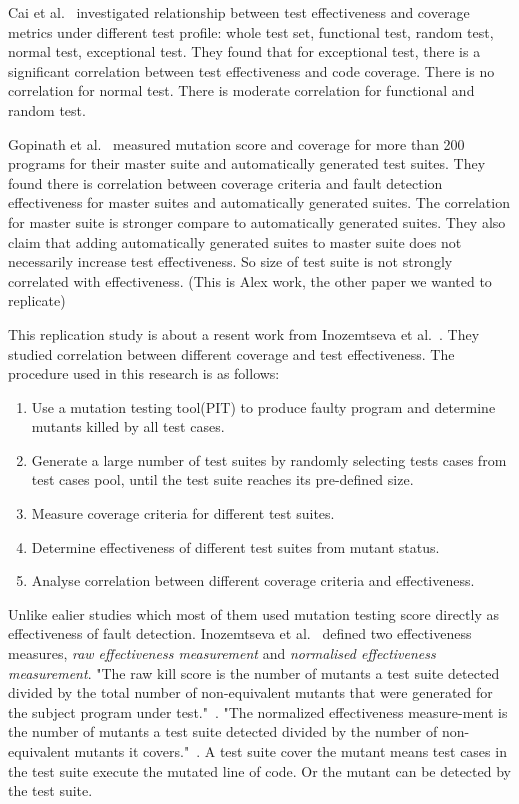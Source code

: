 Cai et al.~\cite{cai2005effect} investigated relationship between test effectiveness and coverage metrics under different test profile: whole test set, functional test, random test, normal test, exceptional test. They found that for exceptional test, there is a significant correlation between test effectiveness and code coverage. There is no correlation for normal test. There is moderate correlation for functional and random test.

Gopinath et al.~\cite{gopinath2014code} measured mutation score and coverage for more than 200 programs for their master suite and automatically generated test suites. They found there is correlation between coverage criteria and fault detection effectiveness for master suites and automatically generated suites. The correlation for master suite is stronger compare to automatically generated suites. They also claim that adding automatically generated suites to master suite does not necessarily increase test effectiveness. So size of test suite is not strongly correlated with effectiveness. (This is Alex work, the other paper we wanted to replicate)

This replication study is about a resent work from Inozemtseva et al.~\cite{inozemtseva2014coverage}. They studied correlation between different coverage and test effectiveness. The procedure used in this research is as follows:
	\begin{enumerate}
		\item Use a mutation testing tool(PIT) to produce faulty program and determine mutants killed by all test cases.
		\item Generate a large number of test suites by randomly selecting tests cases from test cases pool, until the test suite reaches its pre-defined size.
		\item Measure coverage criteria for different test suites.
		\item Determine effectiveness of different test suites from mutant status.
		\item Analyse correlation between different coverage criteria and effectiveness.
	\end{enumerate}

Unlike ealier studies which most of them used mutation testing score directly as effectiveness of fault detection. Inozemtseva et al.~\cite{inozemtseva2014coverage} defined two effectiveness measures, \textit{raw effectiveness measurement} and \textit{normalised effectiveness measurement}. "The raw kill score is the number of mutants a test suite detected divided by the total number of
non-equivalent mutants that were generated for the subject program under test."~\cite{inozemtseva2014coverage}. "The normalized effectiveness measure-ment is the number of mutants a test suite detected divided by the number of non-equivalent mutants it covers."~\cite{inozemtseva2014coverage}. A test suite cover the mutant means test cases in the test suite execute the mutated line of code. Or the mutant can be detected by the test suite. 

